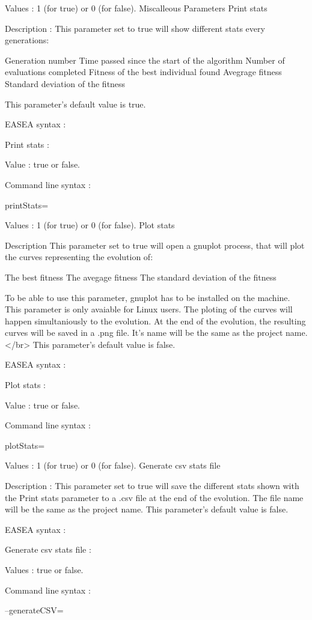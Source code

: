 \documentclass{article}
\begin{document}
Values : 1 (for true) or 0 (for false).
Miscalleous Parameters
Print stats

Description :
This parameter set to true will show different stats every generations:

    Generation number
    Time passed since the start of the algorithm
    Number of evaluations completed
    Fitness of the best individual found
    Avegrage fitness
    Standard deviation of the fitness 

This parameter's default value is true.

EASEA syntax :

Print stats :

Value : true or false.

Command line syntax :

printStats=

Values : 1 (for true) or 0 (for false).
Plot stats

Description
This parameter set to true will open a gnuplot process, that will plot the curves representing the evolution of:

    The best fitness
    The avegage fitness
    The standard deviation of the fitness 

To be able to use this parameter, gnuplot has to be installed on the machine. This parameter is only avaiable for Linux users.
The ploting of the curves will happen simultaniously to the evolution. At the end of the evolution, the resulting curves will be saved in a .png file. It's name will be the same as the project name.</br> This parameter's default value is false.

EASEA syntax :

Plot stats :

Value : true or false.

Command line syntax :

plotStats=

Values : 1 (for true) or 0 (for false).
Generate csv stats file

Description :
This parameter set to true will save the different stats shown with the Print stats parameter to a .csv file at the end of the evolution. The file name will be the same as the project name. This parameter's default value is false.

EASEA syntax :

Generate csv stats file :

Values : true or false.

Command line syntax :

--generateCSV=
\end{document}
